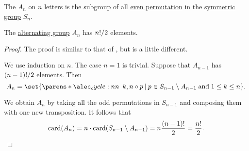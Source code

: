 \begin{definition}\label{def:alternating_group}
  The  \( A_n \) on \( n \) letters is the subgroup of all \hyperref[def:permutation_parity]{even permutation} in the \hyperref[def:symmetric_group]{symmetric group} \( S_n \).
\end{definition}

\begin{proposition}\label{thm:alternating_group_cardinality}
  The \hyperref[def:alternating_group]{alternating group} \( A_n \) has \( n! / 2 \) elements.
\end{proposition}
\begin{proof}
  The proof is similar to that of , but is a little different.

  We use induction on \( n \). The case \( n = 1 \) is trivial. Suppose that \( A_{n-1} \) has \( (n-1)! / 2 \) elements. Then
  \begin{equation*}
    A_n = \set{ \cycle{ k, n } \bincirc p \given p \in S_{n-1} \setminus A_{n-1} \T{and} 1 \leq k \leq n }.
  \end{equation*}

  We obtain \( A_n \) by taking all the odd permutations in \( S_{n-1} \) and composing them with one new transposition. It follows that
  \begin{equation*}
    \operatorname{card}(A_n) = n \cdot \operatorname{card}(S_{n-1} \setminus A_{n-1}) = n \frac {(n-1)!} 2 = \frac {n!} 2.
  \end{equation*}
\end{proof}

